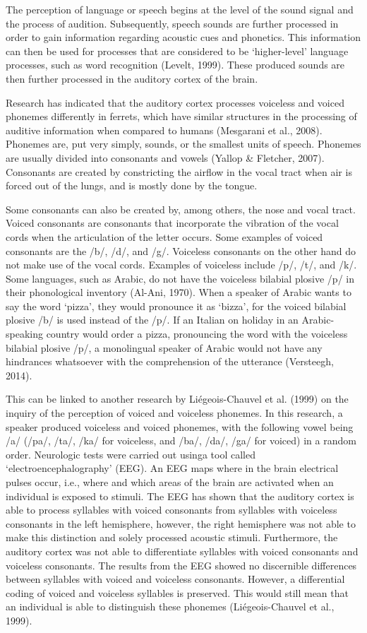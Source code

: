 The perception of language or speech begins at the level of the sound signal and the process of audition. Subsequently, speech sounds are further processed in order to gain information regarding acoustic cues and phonetics. This information can then be used for processes that are considered to be ‘higher-level’ language processes, such as word recognition (Levelt, 1999). These produced sounds are then further processed in the auditory cortex of the brain. 

Research has indicated that the auditory cortex processes voiceless and voiced phonemes differently in ferrets, which have similar structures in the processing of auditive information when compared to humans (Mesgarani et al., 2008). Phonemes are, put very simply, sounds, or the smallest units of speech. Phonemes are usually divided into consonants and vowels (Yallop \& Fletcher, 2007). Consonants are created by constricting the airflow in the vocal tract when air is forced out of the lungs, and is mostly done by the tongue. 

Some consonants can also be created by, among others, the nose and vocal tract. Voiced consonants are consonants that incorporate the vibration of the vocal cords when the articulation of the letter occurs. Some examples of voiced consonants are the /b/, /d/, and /g/. Voiceless consonants on the other hand do not make use of the vocal cords. Examples of voiceless include /p/, /t/, and /k/. Some languages, such as Arabic, do not have the voiceless bilabial plosive /p/ in their phonological inventory (Al-Ani, 1970). When a speaker of Arabic wants to say the word ‘pizza’, they would pronounce it as ‘bizza’, for the voiced bilabial plosive /b/ is used instead of the /p/. If an Italian on holiday in an Arabic-speaking country would order a pizza, pronouncing the word with the voiceless bilabial plosive /p/, a monolingual speaker of Arabic would not have any hindrances whatsoever with the comprehension of the utterance (Versteegh, 2014). 

This can be linked to another research by Liégeois-Chauvel et al. (1999) on the inquiry of the perception of voiced and voiceless phonemes. In this research, a speaker produced voiceless and voiced phonemes, with the following vowel being /a/ (/pa/, /ta/, /ka/ for voiceless, and /ba/, /da/, /ga/ for voiced) in a random order. Neurologic tests were carried out usinga tool called ‘electroencephalography’ (EEG). An EEG maps where in the brain electrical pulses occur, i.e., where and which areas of the brain are activated when an individual is exposed to stimuli. The EEG has shown that the auditory cortex is able to process syllables with voiced consonants from syllables with voiceless consonants in the left hemisphere, however, the right hemisphere was not able to make this distinction and solely processed acoustic stimuli. Furthermore, the auditory cortex was not able to differentiate syllables with voiced consonants and voiceless consonants. The results from the EEG showed no discernible differences between syllables with voiced and voiceless consonants. However, a differential coding of voiced and voiceless syllables is preserved. This would still mean that an individual is able to distinguish these phonemes (Liégeois-Chauvel et al., 1999).


